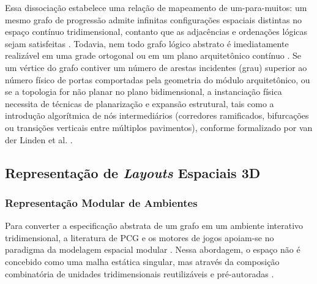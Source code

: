 Essa dissociação estabelece uma relação de mapeamento de um-para-muitos: um mesmo grafo de progressão admite infinitas configurações espaciais distintas no espaço contínuo tridimensional, contanto que as adjacências e ordenações lógicas sejam satisfeitas \cite{dormans2010, linden2013designing}. Todavia, nem todo grafo lógico abstrato é imediatamente realizável em uma grade ortogonal ou em um plano arquitetônico contínuo \cite{linden2013designing, linden2014dungeons}. Se um vértice do grafo contiver um número de arestas incidentes (grau) superior ao número físico de portas comportadas pela geometria do módulo arquitetônico, ou se a topologia for não planar no plano bidimensional, a instanciação física necessita de técnicas de planarização e expansão estrutural, tais como a introdução algorítmica de nós intermediários (corredores ramificados, bifurcações ou transições verticais entre múltiplos pavimentos), conforme formalizado por van der Linden et al. \cite{linden2013designing, linden2014dungeons}.

\subsection{Representação de \textit{Layouts} Espaciais 3D}
\label{sec:layout_3d}

\subsubsection{Representação Modular de Ambientes}
\label{sec:representacao_modular}

Para converter a especificação abstrata de um grafo em um ambiente interativo tridimensional, a literatura de PCG e os motores de jogos apoiam-se no paradigma da modelagem espacial modular \cite{linden2014dungeons, shaker2016constructive, xu2025databasedrivenframework3dlevel}. Nessa abordagem, o espaço não é concebido como uma malha estática singular, mas através da composição combinatória de unidades tridimensionais reutilizáveis e pré-autoradas \cite{linden2014dungeons, shaker2016constructive, xu2025databasedrivenframework3dlevel}.

